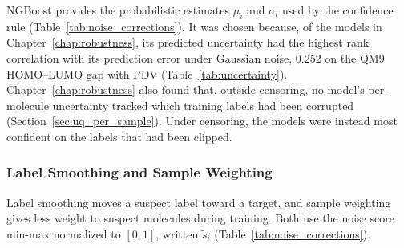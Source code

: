 NGBoost provides the probabilistic estimates $\mu_i$ and $\sigma_i$ used by the confidence rule (Table~\ref{tab:noise_corrections}). It was chosen because, of the models in Chapter~\ref{chap:robustness}, its predicted uncertainty had the highest rank correlation with its prediction error under Gaussian noise, 0.252 on the QM9 HOMO--LUMO gap with PDV (Table~\ref{tab:uncertainty}). Chapter~\ref{chap:robustness} also found that, outside censoring, no model's per-molecule uncertainty tracked which training labels had been corrupted (Section~\ref{sec:uq_per_sample}). Under censoring, the models were instead most confident on the labels that had been clipped.

\subsubsection{Label Smoothing and Sample Weighting}

Label smoothing moves a suspect label toward a target, and sample weighting gives less weight to suspect molecules during training. Both use the noise score min-max normalized to $[0, 1]$, written $\tilde s_i$ (Table~\ref{tab:noise_corrections}).

